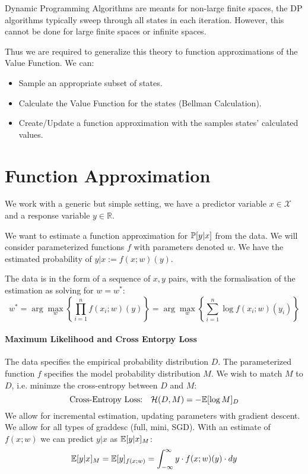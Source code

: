\documentclass[11pt]{article}
\begin{document}
\maketitle
\thispagestyle{first}

Dynamic Programming Algorithms are meants for non-large finite spaces, the DP algorithms typically sweep through all states in each iteration. However, this cannot be done for large finite spaces or infinite spaces.

Thus we are required to generalize this theory to function approximations of the Value Function. 
We can:
\begin{itemize}
    \item Sample an appropriate subset of states.
    \item Calculate the Value Function for the states (Bellman Calculation).
    \item Create/Update a function approximation with the samples states' calculated values.
\end{itemize}

\section{Function Approximation}
We work with a generic but simple setting, we have a predictor variable $x\in\mathcal{X}$ and a response variable $y\in\mathbb{R}$. 

We want to estimate a function approximation for $\P{y|x}$ from the data. We will consider parameterized functions $f$ with parameters denoted $w$. We have the estimated probability of $y|x := f(x; w)(y)$. 

The data is in the form of a sequence of $x, y$ pairs, with the formalisation of the estimation as solving for $w = w^*$:
$$
    w^*  = \arg\max_w \left\{\prod_{i=1}^n f(x_i;w)(y)\right\} = \arg\max_w \left\{\sum_{i=1}^n\log f(x_i;w)(y_i) \right\}
$$
\paragraph*{Maximum Likelihood and Cross Entorpy Loss}
The data specifies the empirical probability distribution $D$.
The parameterized function $f$ specifies the model probability distribution $M$. We wish to match $M$ to $D$, i.e. minimze the cross-entropy between $D$ and $M$:
$$
    \text{Cross-Entropy Loss:}\quad \mathcal{H}(D, M) = -\E{\log M}_D
$$
We allow for incremental estimation, updating parameters with gradient descent. We allow for all types of graddesc (full, mini, SGD). With an estimate of $f(x; w)$ we can predict $y|x$ as $\E{y|x}_M$:
$$
    \E{y|x}_M = \E{y}_{f(x;w)} = \int_{-\infty}^{\infty} y\cdot f(x;w)(y)\cdot dy
$$
\end{document}
